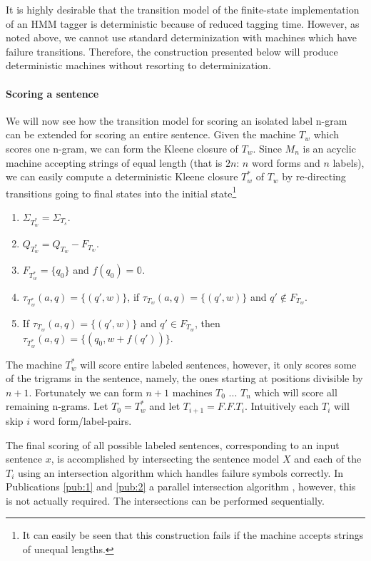 It is highly desirable that the transition model of the finite-state
implementation of an HMM tagger is deterministic because of reduced
tagging time. However, as noted above, we cannot use standard
determinization with machines which have failure
transitions. Therefore, the construction presented below will produce
deterministic machines without resorting to determinization.

\paragraph{Scoring a sentence} We will now see how the transition
model for scoring an isolated label n-gram can be extended for scoring
an entire sentence. Given the machine $T_w$ which scores one n-gram,
we can form the Kleene closure of $T_w$. Since $M_n$ is an acyclic
machine accepting strings of equal length (that is $2n$: $n$ word
forms and $n$ labels), we can easily compute a deterministic Kleene
closure $T_{w}^*$ of $T_w$ by re-directing transitions going to final
states into the initial state\footnote{It can easily be seen that this
  construction fails if the machine accepts strings of unequal
  lengths.}
\begin{enumerate}
\item $\Sigma_{T_w^*} = \Sigma_{T_s}$. 
\item $Q_{T_w^*} = Q_{T_w} - F_{T_w}$.
\item $F_{T_w^*} = \{q_0\}$ and $f(q_0) = \mathbb{0}$.
\item $\tau_{T_w^*}(a,q) = \{(q', w)\}$, if $\tau_{T_w}(a,q) = \{(q',
  w)\}$ and $q'\notin F_{T_w}$.
\item If $\tau_{T_w}(a,q) = \{(q', w)\}$ and $q' \in F_{T_w}$, then
  $\tau_{T_w^*}(a,q) = \{(q_0, w + f(q'))\}$.
\end{enumerate}

The machine $T_{w}^*$ will score entire labeled sentences, however, it
only scores some of the trigrams in the sentence, namely, the ones
starting at positions divisible by $n+1$. Fortunately we can form $n +
1$ machines $T_0$ ... $T_n$ which will score all remaining
n-grams. Let $T_0 = T_{w}^*$ and let $T_{i+1} = F.F.T_i$. Intuitively
each $T_i$ will skip $i$ word form/label-pairs.

The final scoring of all possible labeled sentences, corresponding to
an input sentence $x$, is accomplished by intersecting the sentence
model $X$ and each of the $T_i$ using an intersection algorithm which
handles failure symbols correctly. In Publications \ref{pub:1} and
\ref{pub:2} a parallel intersection algorithm \citep{Silfverberg2009},
however, this is not actually required. The intersections can be
performed sequentially.

